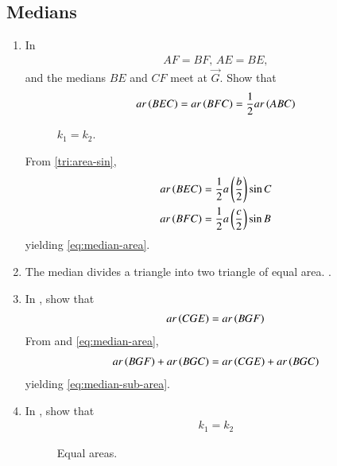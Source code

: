 \subsection{Medians}
\begin{enumerate}[label=\thesubsection.\arabic*.,ref=\thesubsection.\theenumi]
  \item In 
	\begin{align}
	AF = BF, \,
	AE = BE, 
	\end{align}
	and the medians $BE$ and $CF$ meet at $\vec{G}$.
	Show that
\begin{align}
	ar\left(BEC\right)
	=ar\left(BFC\right) = \frac{1}{2}ar\left(ABC\right)
	\label{eq:median-area}
\end{align}
\begin{figure}[!ht]
	\begin{center}
		\resizebox{0.6\columnwidth}{!}{}
	\end{center}
	\caption{$k_1=k_2$.}
	\label{fig:tri_med}	
\end{figure}
\solution
	From \eqref{tri:area-sin},
\begin{align}
	ar\left(BEC\right) &= 
	\frac{1}{2}a\left(\frac{b}{2}\right)\sin C 
	\\
	ar\left(BFC\right)&=
	\frac{1}{2}a\left(\frac{c}{2}\right)\sin  B
\end{align}
yielding
	\eqref{eq:median-area}.
\item The median divides a triangle into two triangle of equal area.
	\label{prob:median-area}.
\item 
	In ,	
	show that
\begin{align}
	ar\left(CGE\right)
	=ar\left(BGF\right) 
	\label{eq:median-sub-area}
\end{align}
\solution 
From 
	and 
	\eqref{eq:median-area},
\begin{align}
	ar\left(BGF\right)
	+
	ar\left(BGC\right)
	=
	ar\left(CGE\right)
	+
	ar\left(BGC\right)
\end{align}
yielding 
	\eqref{eq:median-sub-area}.
\item In 
	,	show that
\begin{align}
	k_1=k_2
	\label{eq:med-ratio-eq}
\end{align}
\begin{figure}[!ht]
	\begin{center}
		\resizebox{0.6\columnwidth}{!}{}
	\end{center}
	\caption{Equal areas.}
	\label{fig:tri_med_isect}	

\end{figure}
\end{enumerate}
